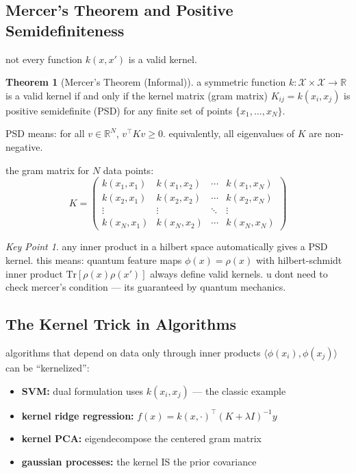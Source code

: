 \documentclass[11pt,a4paper]{article}
\theoremstyle{definition}
\newtheorem{theorem}{Theorem}[section]
\theoremstyle{remark}
\newtheorem*{keypoint}{Key Point}
\begin{document}
\subsection{Mercer's Theorem and Positive Semidefiniteness}

not every function $k(x,x')$ is a valid kernel.

\begin{theorem}[Mercer's Theorem (Informal)]
a symmetric function $k: \mathcal{X} \times \mathcal{X} \to \mathbb{R}$ is a valid kernel if and only if the kernel matrix (gram matrix) $K_{ij} = k(x_i, x_j)$ is positive semidefinite (PSD) for any finite set of points $\{x_1, \ldots, x_N\}$.
\end{theorem}

PSD means: for all $v \in \mathbb{R}^N$, $v^\top K v \geq 0$. equivalently, all eigenvalues of $K$ are non-negative.

the gram matrix for $N$ data points:
\[
K = \begin{pmatrix}
k(x_1, x_1) & k(x_1, x_2) & \cdots & k(x_1, x_N) \\
k(x_2, x_1) & k(x_2, x_2) & \cdots & k(x_2, x_N) \\
\vdots & \vdots & \ddots & \vdots \\
k(x_N, x_1) & k(x_N, x_2) & \cdots & k(x_N, x_N)
\end{pmatrix}
\]

\begin{keypoint}
any inner product in a hilbert space automatically gives a PSD kernel. this means: quantum feature maps $\phi(x) = \rho(x)$ with hilbert-schmidt inner product $\text{Tr}[\rho(x)\rho(x')]$ always define valid kernels. u dont need to check mercer's condition --- its guaranteed by quantum mechanics.
\end{keypoint}

\subsection{The Kernel Trick in Algorithms}

algorithms that depend on data only through inner products $\langle \phi(x_i), \phi(x_j) \rangle$ can be ``kernelized'':

\begin{itemize}
    \item \textbf{SVM:} dual formulation uses $k(x_i, x_j)$ --- the classic example
    \item \textbf{kernel ridge regression:} $f(x) = k(x, \cdot)^\top (K + \lambda I)^{-1} y$
    \item \textbf{kernel PCA:} eigendecompose the centered gram matrix
    \item \textbf{gaussian processes:} the kernel IS the prior covariance
\end{itemize}
\end{document}
